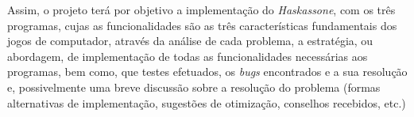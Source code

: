 Assim, o projeto terá por objetivo a implementação do \emph{Haskassone}, com os três programas, cujas as
funcionalidades são as três características fundamentais dos jogos de computador, através da análise de
cada problema, a estratégia, ou abordagem, de implementação de todas as funcionalidades necessárias aos
programas, bem como, que testes efetuados, os \emph{bugs} encontrados e a sua resolução e, possivelmente uma
breve discussão sobre a resolução do problema (formas alternativas de implementação, sugestões de
otimização, conselhos recebidos, etc.)






